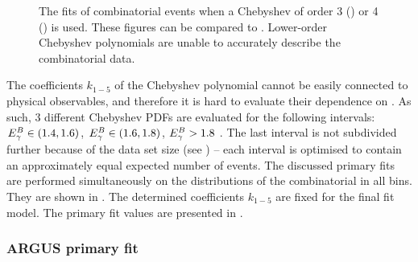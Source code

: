 \begin{figure}[htbp!]
    \centering
    \caption{\label{fig:lower_order_chebyshev}The \Mbc fits of combinatorial \BB events when a Chebyshev \PDF of order 3 () or 4 () is used.
    These figures can be compared to .
    Lower-order Chebyshev polynomials are unable to accurately describe the combinatorial \BB data.
    }
\end{figure}


The coefficients $k_{1-5}$ of the Chebyshev polynomial cannot be easily connected to physical observables,
and therefore it is hard to evaluate their dependence on \EB.
As such, 3 different Chebyshev PDFs are evaluated for the following intervals: ${E^B_{\gamma}}\in(1.4,1.6)$, ${E^B_{\gamma}}\in(1.6,1.8)$, ${E^B_{\gamma}}>1.8$ \gev.
The last interval is not subdivided further because of the data set size (see ) -- each interval is optimised to contain an approximately equal expected number of events.
The discussed primary fits are performed simultaneously on the \Mbc distributions of the combinatorial \BB in all \EB bins.
They are shown in .
The determined coefficients $k_{1-5}$ are fixed for the final \Mbc fit model.
The primary fit values are presented in .

\subsubsection{ARGUS primary fit}\label{sec:argus_prefit}

